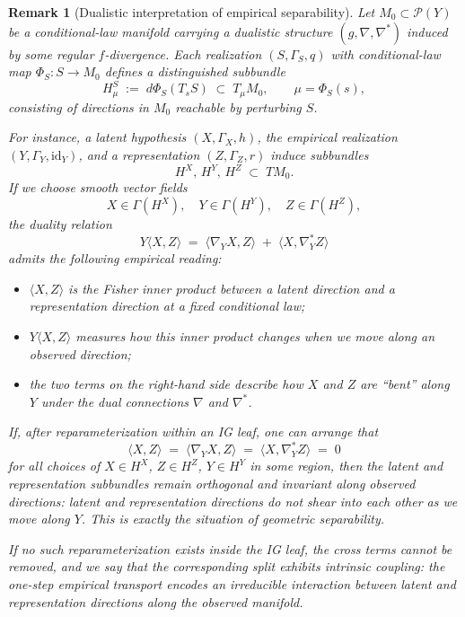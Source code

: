 \documentclass[11pt]{article}
\newtheorem{remark}{Remark}
\newcommand{\Pcal}{\mathcal{P}}
\begin{document}
\begin{remark}[Dualistic interpretation of empirical separability]
\label{rem:dualistic-emp-separability}
Let $M_0 \subset \Pcal(Y)$ be a conditional-law manifold carrying a
dualistic structure $(g,\nabla,\nabla^\ast)$ induced by some regular
$f$-divergence. Each realization $(S,\Gamma_S,q)$ with conditional-law
map $\Phi_S : S \to M_0$ defines a distinguished subbundle
\[
  H^S_\mu \;:=\; d\Phi_S(T_s S) \;\subset\; T_\mu M_0,
  \qquad \mu = \Phi_S(s),
\]
consisting of directions in $M_0$ reachable by perturbing $S$.

For instance, a latent hypothesis $(X,\Gamma_X,h)$, the empirical
realization $(Y,\Gamma_Y,\mathrm{id}_Y)$, and a representation
$(Z,\Gamma_Z,r)$ induce subbundles
\[
  H^X,\, H^Y,\, H^Z \;\subset\; TM_0.
\]
If we choose smooth vector fields
\[
  X \in \Gamma(H^X),\quad
  Y \in \Gamma(H^Y),\quad
  Z \in \Gamma(H^Z),
\]
the duality relation
\[
  Y\langle X,Z\rangle
  \;=\;
  \langle \nabla_Y X, Z\rangle
  \;+\;
  \langle X, \nabla^\ast_Y Z\rangle
\]
admits the following empirical reading:
\begin{itemize}[leftmargin=1.6em]
  \item $\langle X,Z\rangle$ is the Fisher inner product between a
  latent direction and a representation direction at a fixed conditional
  law;
  \item $Y\langle X,Z\rangle$ measures how this inner product changes
  when we move along an observed direction;
  \item the two terms on the right-hand side describe how $X$ and $Z$
  are ``bent'' along $Y$ under the dual connections $\nabla$ and
  $\nabla^\ast$.
\end{itemize}

If, after reparameterization within an IG leaf, one can arrange that
\[
  \langle X,Z\rangle
  \;=\;
  \langle \nabla_Y X, Z\rangle
  \;=\;
  \langle X, \nabla^\ast_Y Z\rangle
  \;=\; 0
\]
for all choices of $X \in H^X$, $Z \in H^Z$, $Y \in H^Y$ in some
region, then the latent and representation subbundles remain orthogonal
and invariant along observed directions: latent and representation
directions do not shear into each other as we move along $Y$. This is
exactly the situation of geometric separability.

If no such reparameterization exists inside the IG leaf, the cross
terms cannot be removed, and we say that the corresponding split
exhibits intrinsic coupling: the one-step empirical transport encodes an
irreducible interaction between latent and representation directions
along the observed manifold.
\end{remark}
\end{document}
